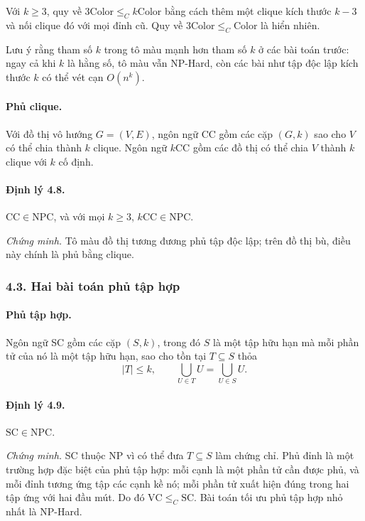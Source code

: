 \documentclass[11pt]{article}
\begin{document}
Với \(k\ge3\), quy về \(3\mathrm{Color}\le_C k\mathrm{Color}\) bằng cách thêm
một clique kích thước \(k-3\) và nối clique đó với mọi đỉnh cũ. Quy về
\(3\mathrm{Color}\le_C\mathrm{Color}\) là hiển nhiên.

Lưu ý rằng tham số \(k\) trong tô màu mạnh hơn tham số \(k\) ở các bài toán
trước: ngay cả khi \(k\) là hằng số, tô màu vẫn NP-Hard, còn các bài như tập
độc lập kích thước \(k\) có thể vét cạn \(O(n^k)\).

\paragraph{Phủ clique.}
Với đồ thị vô hướng \(G=(V,E)\), ngôn ngữ CC gồm các cặp \((G,k)\) sao cho
\(V\) có thể chia thành \(k\) clique. Ngôn ngữ \(k\)CC gồm các đồ thị có thể
chia \(V\) thành \(k\) clique với \(k\) cố định.

\paragraph{Định lý 4.8.}
\(\mathrm{CC}\in\mathrm{NPC}\), và với mọi \(k\ge3\),
\(k\mathrm{CC}\in\mathrm{NPC}\).

\emph{Chứng minh.}
Tô màu đồ thị tương đương phủ tập độc lập; trên đồ thị bù, điều này chính là
phủ bằng clique.

\subsubsection*{4.3. Hai bài toán phủ tập hợp}

\paragraph{Phủ tập hợp.}
Ngôn ngữ SC gồm các cặp \((S,k)\), trong đó \(S\) là một tập hữu hạn mà mỗi
phần tử của nó là một tập hữu hạn, sao cho tồn tại \(T\subseteq S\) thỏa
\[
  |T|\le k,\qquad \bigcup_{U\in T}U=\bigcup_{U\in S}U.
\]

\paragraph{Định lý 4.9.}
\(\mathrm{SC}\in\mathrm{NPC}\).

\emph{Chứng minh.}
SC thuộc NP vì có thể đưa \(T\subseteq S\) làm chứng chỉ. Phủ đỉnh là một
trường hợp đặc biệt của phủ tập hợp: mỗi cạnh là một phần tử cần được phủ, và
mỗi đỉnh tương ứng tập các cạnh kề nó; mỗi phần tử xuất hiện đúng trong hai tập
ứng với hai đầu mút. Do đó \(\mathrm{VC}\le_C\mathrm{SC}\). Bài toán tối ưu phủ
tập hợp nhỏ nhất là NP-Hard.
\end{document}

